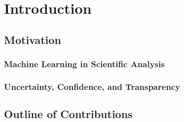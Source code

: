 \chapter{Introduction}

\section{Motivation}
\subsection{Machine Learning in Scientific Analysis}
\subsection{Uncertainty, Confidence, and Transparency}

\section{Outline of Contributions}